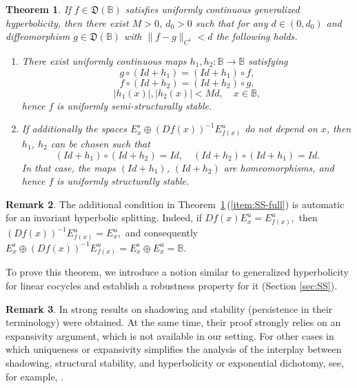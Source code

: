 \documentclass[12pt]{article}
\newcommand{\Bb}{\mathbb{B}}
\newcommand{\DUC}{\mathfrak{D}}
\newtheorem{thm}{Theorem}
\theoremstyle{definition}
\newtheorem{remark}[thm]{Remark}
\begin{document}
\begin{thm}\label{thm:SS}
If $f \in \DUC(\Bb)$ satisfies uniformly continuous generalized hyperbolicity, then there exist $M>0$, $d_0 > 0$ such that for any $d \in (0, d_0)$ and diffeomorphism $g \in \DUC(\Bb)$ with $\|f-g\|_{C^1} < d$ the following holds.
    \begin{enumerate}[
    label=\textup{(S\arabic*)},
    ref=\textup{S\arabic*}
]
        \item \label{item:SS-semi}
            There exist uniformly continuous maps $h_1, h_2:\Bb \to \Bb$ satisfying
        \begin{equation}\label{eq:conj-h1}
        g \circ (Id+h_1) = (Id + h_1) \circ f,
        \end{equation}
        \begin{equation}\label{eq:conj-h2}
        f \circ (Id+h_2) = (Id + h_2) \circ g,
        \end{equation}
        \begin{equation}\label{eq:h1h2leqMdelta}
        |h_1(x)|, |h_2(x)| < Md, \quad x \in \Bb,
        \end{equation}
        hence $f$ is uniformly semi-structurally stable.
        \item \label{item:SS-full}
        If additionally the spaces $E^s_x \oplus (Df(x))^{-1}E^u_{f(x)}$ do not depend on $x$, then $h_1$, $h_2$ can be chosen such that 
        \begin{equation}\label{eq:Idh-homeo}
        (Id+h_1) \circ (Id+h_2) = Id, \quad (Id+h_2) \circ (Id+h_1) = Id.
        \end{equation}
In that case, the maps $(Id+h_1)$, $(Id+h_2)$ are homeomorphisms, and hence $f$ is uniformly structurally stable.
    \end{enumerate}
\end{thm}

\begin{remark}
The additional condition in Theorem~\ref{thm:SS}\,(\ref{item:SS-full}) is automatic for an invariant hyperbolic splitting. Indeed, if
$
Df(x)E_x^u=E_{f(x)}^u,
$
then
$
(Df(x))^{-1}E_{f(x)}^u=E_x^u,
$
and consequently
$
E_x^s\oplus(Df(x))^{-1}E_{f(x)}^u
=
E_x^s\oplus E_x^u
=
\Bb.
$
\end{remark}

To prove this theorem, we introduce a notion similar to generalized hyperbolicity for linear cocycles and establish a robustness property for it (Section \ref{sec:SS}). 

\begin{remark}\label{rem:LaniWaydaResults}
    In \cite{LaniWayda1995} strong results on shadowing and stability (persistence in their terminology) were obtained. At the same time, their proof strongly relies on an expansivity argument, which is not available in our setting. For other cases in which uniqueness or expansivity simplifies the analysis of the interplay between shadowing, structural stability, and hyperbolicity or exponential dichotomy, see, for example, \cite{Henry94}.
\end{remark}
\end{document}
